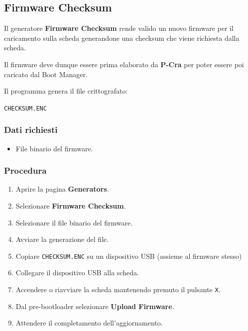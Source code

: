 \documentclass[11pt,a4paper]{article}
\newcommand{\software}{\textbf{P-Cra}}
\newcommand{\button}[1]{\textbf{#1}}
\newcommand{\filename}[1]{\texttt{#1}}
\begin{document}
\subsection{Firmware Checksum}

Il generatore \button{Firmware Checksum} rende valido un nuovo firmware
per il caricamento sulla scheda generandone una checksum che viene richiesta dalla scheda.

Il firmware deve dunque essere prima elaborato da \software{} per poter
essere poi caricato dal Boot Manager.

Il programma genera il file crittografato:

\begin{center}
    \filename{CHECKSUM.ENC}
\end{center}

\subsubsection*{Dati richiesti}

\begin{itemize}
    \item File binario del firmware.
\end{itemize}

\subsubsection*{Procedura}

\begin{enumerate}
    \item Aprire la pagina \button{Generators}.
    \item Selezionare \button{Firmware Checksum}.
    \item Selezionare il file binario del firmware.
    \item Avviare la generazione del file.
    \item Copiare \filename{CHECKSUM.ENC} su un dispositivo USB (assieme al firmware stesso)
    \item Collegare il dispositivo USB alla scheda.
    \item Accendere o riavviare la scheda mantenendo premuto
    il pulsante \texttt{X}.
    \item Dal pre-bootloader selezionare \button{Upload Firmware}.
    \item Attendere il completamento dell'aggiornamento.
\end{enumerate}
\end{document}
